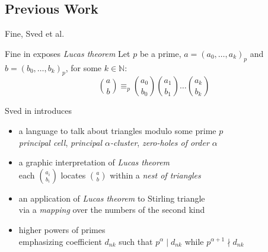\documentclass[10pt,serif, professionalfont]{beamer}
\begin{document}
\subsection{Previous Work}

\begin{frame}{Fine, Sved et al.}

    \begin{block}{Fine in \cite{Fine1947} exposes \emph{Lucas theorem}}
        Let $p$ be a prime, $a=(a_{0},\ldots,a_{k})_{p}$ and $b=(b_{0},\ldots,b_{k})_{p}$, for some $k\in\mathbb{N}$:
        \begin{displaymath}
            {{a}\choose{b}} \equiv_{p} {{a_{0}}\choose{b_{0}}}{{a_{1}}\choose{b_{1}}}
                \ldots{{a_{k}}\choose{b_{k}}}
        \end{displaymath}
    \end{block}
    \pause
    \begin{block}{Sved in \cite{Sved1998} introduces}
        \begin{itemize}
            \item {\normalsize a language to talk about triangles modulo some prime $p$}\\
                \footnotesize{\emph{principal cell}, \emph{principal $\alpha$-cluster}, \emph{zero-holes of order $\alpha$}}
            \item {\normalsize a graphic interpretation of \emph{Lucas theorem} }\\
                \footnotesize{each ${{a_i}\choose{b_i}}$ locates ${{a}\choose{b}}$ within a \emph{nest of triangles}}
            \item {\normalsize an application of \emph{Lucas theorem} to Stirling triangle}\\
                \footnotesize{via a \emph{mapping} over the numbers of the second kind}
            \item {\normalsize higher powers of primes}\\
                \footnotesize{emphasizing coefficient $d_{nk}$ such that 
                    $p^{\alpha}\mid d_{nk}$ while $p^{\alpha+1}\nmid d_{nk}$}
        \end{itemize}
    \end{block}
\end{frame}
\end{document}
